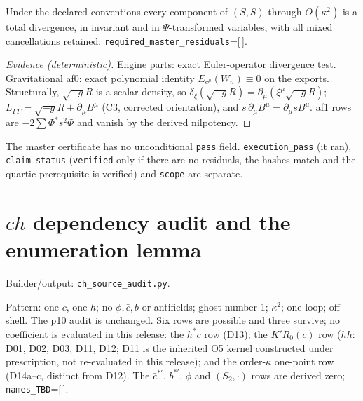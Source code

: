 \begin{proposition}
Under the declared conventions every component of $(S,S)$ through $O(\kappa^2)$ is a total divergence, in invariant
and in $\Psi$-transformed variables, with all mixed cancellations retained:
\texttt{required\_master\_residuals}=[\,].
\end{proposition}
\begin{proof}[Evidence (deterministic)]
Engine parts: exact Euler-operator divergence test. Gravitational af0: exact polynomial identity
$E_{c^\mu}(W_n)\equiv0$ on the exports. Structurally, $\sqrt{-g}R$ is a scalar density, so
$\delta_\xi(\sqrt{-g}R)=\partial_\mu(\xi^\mu\sqrt{-g}R)$; $L_{\Gamma\Gamma}=\sqrt{-g}R+\partial_\mu B^\mu$ (C3, corrected
orientation), and $s\,\partial_\mu B^\mu=\partial_\mu sB^\mu$. af1 rows are $-2\sum\Phi^*s^2\Phi$ and vanish by the
derived nilpotency.
\end{proof}
The master certificate has no unconditional \texttt{pass} field. \texttt{execution\_pass} (it ran), \texttt{claim\_status}
(\texttt{verified} only if there are no residuals, the hashes match and the quartic prerequisite is verified) and
\texttt{scope} are separate.

\section{$ch$ dependency audit and the enumeration lemma}
\noindent Builder/output: \texttt{ch\_source\_audit.py}.\par\smallskip
Pattern: one $c$, one $h$; no $\phi,\bar c,b$ or antifields; ghost number 1; $\kappa^2$; one loop; off-shell. The p10
audit is unchanged. Six rows are possible and three survive; no coefficient is evaluated in this release: the $h^*c$ row (D13); the
$K'R_0(c)$ row ($hh$: D01, D02, D03, D11, D12; D11 is the inherited O5 kernel constructed under prescription, not
re-evaluated in this release); and the order-$\kappa$ one-point row (D14a--c, distinct from D12). The
$\bar c^{*\prime}$, $b^{*\prime}$, $\phi$ and $(S_2,\cdot)$ rows are derived zero; \texttt{names\_TBD}=[\,].

